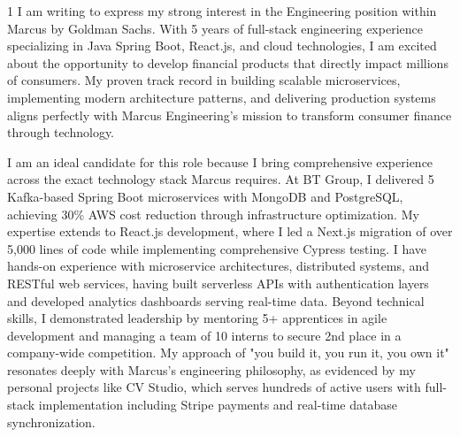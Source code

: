 \documentclass[11pt,a4paper,ragged2e]{altacv}
\begin{document}
\RaggedRight
{}
\makecvheader
\begin{paracol}{1}
\smallskip
{}
I am writing to express my strong interest in the Engineering position within Marcus by Goldman Sachs. With 5 years of full-stack engineering experience specializing in Java Spring Boot, React.js, and cloud technologies, I am excited about the opportunity to develop financial products that directly impact millions of consumers. My proven track record in building scalable microservices, implementing modern architecture patterns, and delivering production systems aligns perfectly with Marcus Engineering's mission to transform consumer finance through technology.

I am an ideal candidate for this role because I bring comprehensive experience across the exact technology stack Marcus requires. At BT Group, I delivered 5 Kafka-based Spring Boot microservices with MongoDB and PostgreSQL, achieving 30\% AWS cost reduction through infrastructure optimization. My expertise extends to React.js development, where I led a Next.js migration of over 5,000 lines of code while implementing comprehensive Cypress testing. I have hands-on experience with microservice architectures, distributed systems, and RESTful web services, having built serverless APIs with authentication layers and developed analytics dashboards serving real-time data. Beyond technical skills, I demonstrated leadership by mentoring 5+ apprentices in agile development and managing a team of 10 interns to secure 2nd place in a company-wide competition. My approach of "you build it, you run it, you own it" resonates deeply with Marcus's engineering philosophy, as evidenced by my personal projects like CV Studio, which serves hundreds of active users with full-stack implementation including Stripe payments and real-time database synchronization.


\end{paracol}
\end{document}
